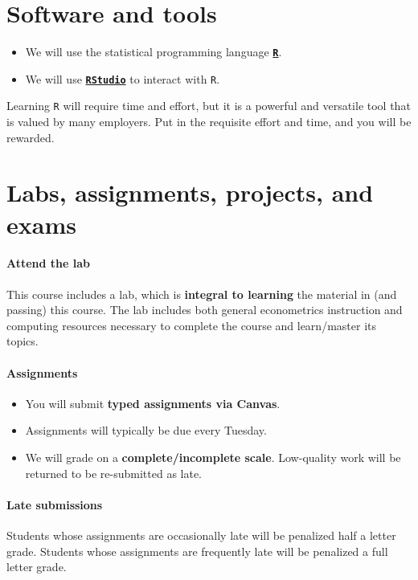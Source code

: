 \documentclass[10pt]{article}
\newcommand{\emf}[1]{\textbf{\textcolor{grass_green}{#1}}}
\begin{document}
\section*{Software and tools}

\begin{itemize}
  \item We will use the statistical programming language \href{https://www.r-project.org/}{\textbf{\texttt{R}}}.
  \item We will use \href{https://www.rstudio.com}{\textbf{\texttt{RStudio}}} to interact with \texttt{R}.
\end{itemize}
Learning \texttt{R} will require time and effort, but it is a powerful and versatile tool that is valued by many employers. Put in the requisite effort and time, and you will be rewarded.

\section*{Labs, assignments, projects, and exams}

\paragraph{Attend the lab} This course includes a lab, which is \emf{integral to learning} the material in (and passing) this course. The lab includes both general econometrics instruction and computing resources necessary to complete the course and learn/master its topics.

\paragraph{Assignments}
\begin{itemize}
  \item You will submit \emf{typed assignments via Canvas}.
  \item Assignments will typically be due every Tuesday.
  \item We will grade on a \emf{complete/incomplete scale}. Low-quality work will be returned to be re-submitted as late.
\end{itemize}

\paragraph{Late submissions} Students whose assignments are occasionally late will be penalized half a letter grade. Students whose assignments are frequently late will be penalized a full letter grade.
\end{document}
